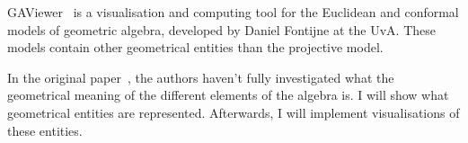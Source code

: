 \documentclass[a4paper,11pt,twoside]{article}
\begin{document}
GAViewer~\cite{GAViewer} is a visualisation and computing tool for the Euclidean and conformal models of geometric algebra, developed by Daniel Fontijne at the UvA.  These models contain other geometrical entities than the projective model.

In the original paper~\cite{Hongbo}, the authors haven't fully investigated what the geometrical meaning of the different elements of the algebra is.  I will show what geometrical entities are represented.  Afterwards, I will implement visualisations of these entities.

{}

\end{document}
